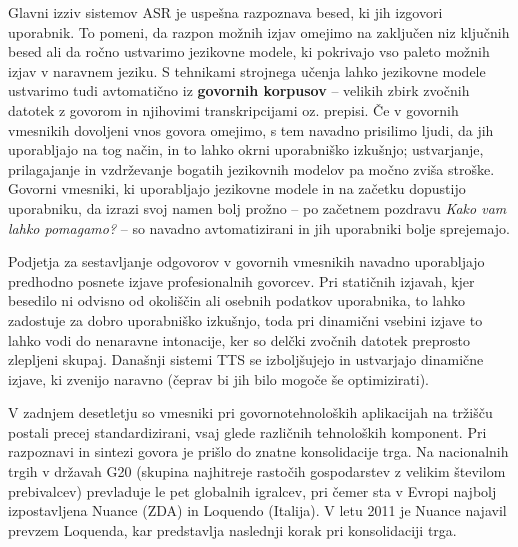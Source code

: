 \begin{multicols}{2}
Glavni izziv sistemov ASR je uspešna razpoznava besed, ki jih izgo\-vori uporabnik. To po\-meni, da razpon možnih izjav omejimo na zaključen niz ključnih besed ali da ročno ustvarimo jezikovne mo\-dele, ki pokrivajo vso paleto možnih izjav v narav\-nem jeziku. S tehnikami stroj\-nega učenja lahko jezikovne mo\-dele ustvarimo tudi avtomatično iz \textbf{govornih korpusov} – velikih zbirk zvočnih datotek z go\-vorom in njihovimi transkripcijami oz. prepisi. Če v go\-vornih vmesnikih dovoljeni vnos go\-vora omejimo, s tem navadno prisilimo ljudi, da jih uporab\-ljajo na tog način, in to lahko okrni uporabniško izkušnjo; ustvarjanje, prilagajanje in vzdrževanje bogatih jezikovnih mo\-delov pa močno zviša stroške. Go\-vorni vmesniki, ki uporab\-ljajo jezikovne mo\-dele in na začetku dopustijo uporabniku, da izrazi svoj namen bolj prožno – po začetnem pozdravu \textit{Kako vam lahko pomagamo?} – so navadno avtomatizirani in jih uporabniki bolje sprejemajo.

Podjetja za sestav\-ljanje odgo\-vorov v go\-vornih vmesnikih navadno uporab\-ljajo predhodno posnete izjave profesionalnih go\-vorcev. Pri statičnih izjavah, kjer besedilo ni odvisno od okoliščin ali oseb\-nih podatkov uporabnika, to lahko zadostuje za dobro uporabniško izkušnjo, toda pri dinamični vsebini izjave to lahko vodi do nenaravne intonacije, ker so delčki zvočnih datotek preprosto zlepljeni skupaj. Današnji sistemi TTS se izboljšujejo  in ustvarjajo dinamične izjave, ki zvenijo naravno (čeprav bi jih bilo mogoče še optimizirati).


V zadnjem desetletju so vmesniki pri go\-vor\-notehnoloških aplikacijah na tržišču postali precej standardizirani, vsaj glede različnih tehnoloških komponent. Pri razpoznavi in sintezi go\-vora je prišlo do znatne konsolidacije trga. Na nacionalnih trgih v državah G20 (skupina naj\-hitreje rastočih gospodarstev z velikim številom prebivalcev) prevladuje le pet globalnih igralcev, pri čemer sta v Evropi naj\-bolj izpostav\-ljena Nuance (ZDA) in Loquendo (Italija). V letu 2011 je Nuance najavil prevzem Loquenda, kar predstav\-lja naslednji korak pri konsolidaciji trga.


\end{multicols}
